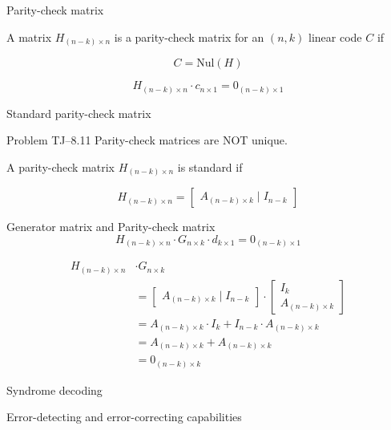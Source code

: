 \begin{frame}{Parity-check matrix}
  \begin{definition}
	A matrix $H_{(n - k) \times n}$ is a parity-check matrix for an $(n,k)$ linear code $C$ if

	\[
	  C = \text{Nul}(H)
	\]
  \end{definition}

  \[
	H_{(n - k) \times n} \cdot c_{n \times 1} = 0_{(n - k) \times 1}
  \]
\end{frame}
\begin{frame}{Standard parity-check matrix}
  \begin{exampleblock}{Problem TJ--8.11}
	Parity-check matrices are NOT unique.
  \end{exampleblock}

  \begin{definition}
	A parity-check matrix $H_{(n-k) \times n}$ is standard if

	\[
	  H_{(n-k) \times n} = \begin{bmatrix}
		A_{(n-k) \times k} \mid I_{n-k}
	  \end{bmatrix}
	\]
  \end{definition}
\end{frame}
\begin{frame}{Generator matrix and Parity-check matrix}
  \[
	H_{(n-k) \times n} \cdot G_{n \times k} \cdot d_{k \times 1} = 0_{(n-k) \times 1}
  \]

  \begin{align*}
	H_{(n-k) \times n} &\cdot G_{n \times k} \\
	&= \begin{bmatrix}
	  A_{(n-k) \times k} \mid I_{n-k} 
	\end{bmatrix}
	\cdot
	\begin{bmatrix}
	  I_k \\ A_{(n-k) \times k}
	\end{bmatrix} \\
	&= A_{(n-k) \times k} \cdot I_k + I_{n-k} \cdot A_{(n-k) \times k} \\
	&= A_{(n-k) \times k} + A_{(n-k) \times k} \\
	&= 0_{(n-k) \times k}
  \end{align*}
\end{frame}
\begin{frame}{Syndrome decoding}
\end{frame}
\begin{frame}{Error-detecting and error-correcting capabilities}
\end{frame}
